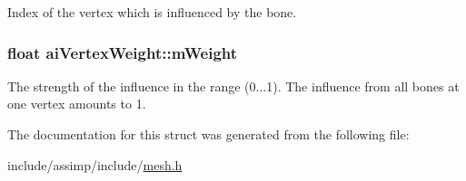 Index of the vertex which is influenced by the bone. 

\hypertarget{structai_vertex_weight_abab9c49baabc2cafef9ac840f59e61b8}{
\subsubsection[{m\-Weight}]{\setlength{\rightskip}{0pt plus 5cm}float ai\-Vertex\-Weight\-::m\-Weight}}\label{structai_vertex_weight_abab9c49baabc2cafef9ac840f59e61b8}
The strength of the influence in the range (0...1). The influence from all bones at one vertex amounts to 1. 

The documentation for this struct was generated from the following file\-:\begin{DoxyCompactItemize}
\item 
include/assimp/include/\hyperlink{mesh_8h}{mesh.\-h}\end{DoxyCompactItemize}

